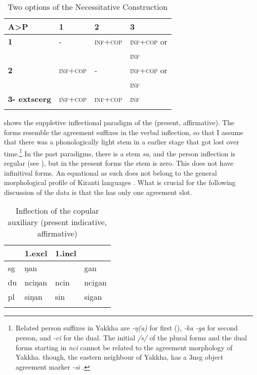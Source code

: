 \begin{table}
\centering
\begin{tabular}{llll}
\lsptoprule
{\bf A>P}&{\bf 1}&{\bf 2}&{\bf 3}\\
\midrule
 {\bf 1}	&-&\textsc{inf}+\textsc{cop}&\textsc{inf}+\textsc{cop} or\\
 &&&\textsc{inf}\\
 \midrule
 {\bf 2}&\textsc{inf}+\textsc{cop}&-&\textsc{inf}+\textsc{cop} or\\
 &&&\textsc{inf}\\
 \midrule
 {\bf 3-	extsc{erg}}&\textsc{inf}+\textsc{cop}&\textsc{inf}+\textsc{cop}&\textsc{inf}\\
 \lspbottomrule
\end{tabular}
\caption{Two options of the Necessitative Construction}\label{cop-options}
\end{table}


 shows the suppletive inflectional paradigm of the  (present, affirmative). The forms resemble the agreement suffixes in the verbal inflection, so that I assume that there was a phonologically light stem in a earlier stage that got lost over time.\footnote{Related person suffixes in Yakkha are \emph{-ŋ(a)} for first (), \emph{-ka \ti -ga} for second person, and \emph{-ci} for the dual. The initial  \emph{/s/} of the plural  forms and the dual forms starting in \emph{nci} cannot be related to the agreement morphology of Yakkha.  though, the eastern neighbour of Yakkha, has a 3nsg object agreement marker \emph{-si} \citep[76]{Driem1987A-grammar}.}  In the past paradigms, there is a stem \emph{sa}, and the person inflection is regular (see ), but in the present forms the stem is zero. This  does not have infinitival forms. An equational  as such does not belong to the general morphological profile of Kiranti languages \citep[276]{Bickel1999Nominalization}. What is crucial for the following discussion of the data is that the  has only one agreement slot.

\begin{table}[htp]
\begin{center}
\begin{tabular}{llll}
\lsptoprule
&{\sc 1.excl}&{\sc 1.incl}&{\sc 2}\\
\midrule
{\sc sg}&  ŋan& &gan\\
{\sc du} & nciŋan&ncin& ncigan \\
{\sc pl}  & siŋan& sin&sigan\\
\lspbottomrule
\end{tabular}
\caption{Inflection of the copular auxiliary (present indicative, affirmative)}\label{copula}
\end{center}
\end{table}



